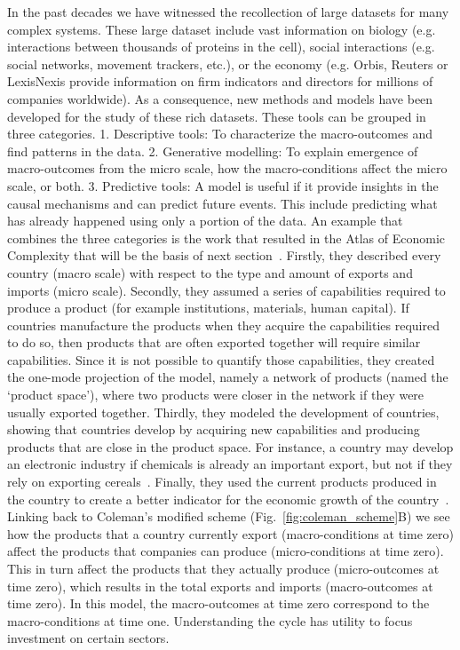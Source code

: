 In the past decades we have witnessed the recollection of large datasets for many complex systems. 
These large dataset include vast information on biology (e.g. interactions between thousands of proteins in the cell),
social interactions (e.g. social networks, movement trackers, etc.),
or the economy (e.g. Orbis, Reuters or LexisNexis provide information on firm indicators and directors for millions of companies worldwide).
As a consequence, new methods and models have been developed for the study of these rich datasets. 
These tools can be grouped in three categories.
1. Descriptive tools: To characterize the macro-outcomes and find patterns in the data.
2. Generative modelling: To explain emergence of macro-outcomes from the micro scale, how the macro-conditions affect the micro scale, or both.
3. Predictive tools: A model is useful if it provide insights in the causal mechanisms and can predict future events. This include predicting what has already happened using only a portion of the data. 
An example that combines the three categories is the work that resulted in the Atlas of Economic Complexity that will be the basis of next section~\citep{Hausmann2006,hidalgo2007,hidalgo2009,hausmann2011}.
Firstly, they described every country (macro scale) with respect to the type and amount of exports and imports (micro scale). 
Secondly, they assumed a series of capabilities required to produce a product (for example institutions, materials, human capital). 
If countries manufacture the products when they acquire the capabilities required to do so, 
then products that are often exported together will require similar capabilities.
Since it is not possible to quantify those capabilities, they created the one-mode projection of the model,
namely a network of products (named the `product space'), 
where two products were closer in the network if they were usually exported together. 
Thirdly, they modeled the development of countries, showing that countries develop by acquiring new capabilities and producing products that are close in the product space.
For instance, a country may develop an electronic industry if chemicals is already an important export, 
but not if they rely on exporting cereals~\citep{hidalgo2007}. 
Finally, they used the current products produced in the country to create a better indicator for the economic growth of the country~\citep{hausmann2011}.
Linking back to Coleman’s modified scheme (Fig.~\ref{fig:coleman_scheme}B) we see how the products that a country currently export (macro-conditions at time zero) affect the products that companies can produce (micro-conditions at time zero). 
This in turn affect the products that they actually produce (micro-outcomes at time zero), 
which results in the total exports and imports (macro-outcomes at time zero).
In this model, the macro-outcomes at time zero correspond to the macro-conditions at time one. 
Understanding the cycle has utility to focus investment on certain sectors.


